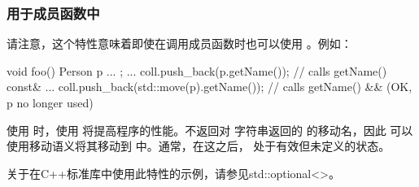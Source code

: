 \subsubsection{ 用于成员函数中}

请注意，这个特性意味着即使在调用成员函数时也可以使用 。例如：

\begin{cppcode}
void foo()
{
	Person p{ ... };
	...
	coll.push_back(p.getName()); // calls getName() const&
	...
	coll.push_back(std::move(p).getName()); // calls getName() && (OK, p no longer used)
}
\end{cppcode}

使用  时，使用  将提高程序的性能。不返回对  字符串返回的  的移动名，因此  可以使用移动语义将其移动到  中。通常，在这之后， 处于有效但未定义的状态。

关于在C++标准库中使用此特性的示例，请参见std::optional<>。
















